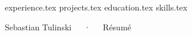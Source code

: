 \documentclass{awesome-cv}
\newcommand*{\sectiondir}{resume/}
\begin{document}
\makecvheader

{experience.tex}
{projects.tex}
{education.tex}
{skills.tex}

\makecvfooter
  {}
  {Sebastian Tulinski~~~·~~~Résumé}
  {}
\end{document}
